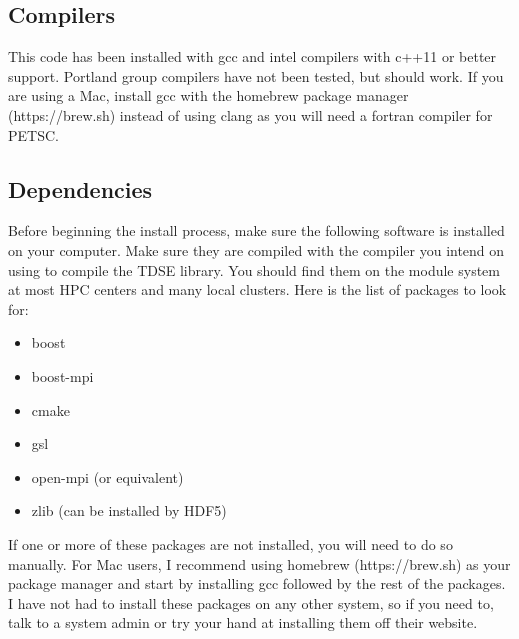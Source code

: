 \documentclass{article}
\begin{document}

\subsection{Compilers} %
\label{sub:compilers}
This code has been installed with gcc and intel compilers with c++11 or better support. Portland group compilers have not been tested, but should work. If you are using a Mac, install gcc with the homebrew package manager (https://brew.sh) instead of using clang as you will need a fortran compiler for PETSC.

\subsection{Dependencies} %
\label{sub:dependencies}
Before beginning the install process, make sure the following software is installed on your computer. Make sure they are compiled with the compiler you intend on using to compile the TDSE library. You should find them on the module system at most HPC centers and many local clusters. Here is the list of packages to look for:
\begin{itemize}
  \item boost  
  \item boost-mpi 
  \item cmake
  \item gsl   
  \item open-mpi (or equivalent)
  \item zlib (can be installed by HDF5)
\end{itemize}
If one or more of these packages are not installed, you will need to do so manually. For Mac users, I recommend using homebrew (https://brew.sh) as your package manager and start by installing gcc followed by the rest of the packages. I have not had to install these packages on any other system, so if you need to, talk to a system admin or try your hand at installing them off their website.
\end{document}
